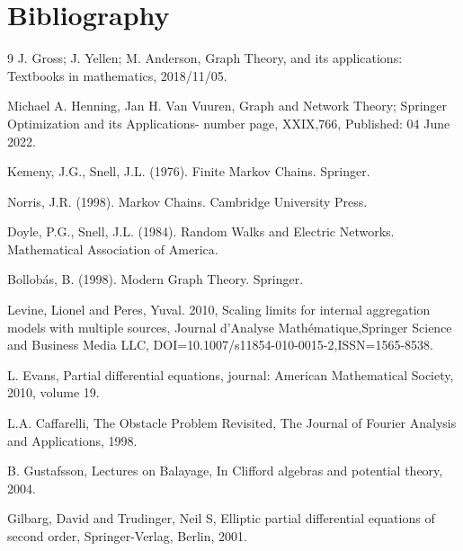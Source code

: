 \documentclass{article}
\begin{document}
\section{Bibliography}
\begin{thebibliography}{9}
    J. Gross; J. Yellen; M. Anderson, Graph Theory, and its applications: Textbooks in mathematics, 2018/11/05.
    
     Michael A. Henning, Jan H. Van Vuuren, Graph and Network Theory; Springer Optimization and its Applications- number page, XXIX,766, Published: 04 June 2022.

    Kemeny, J.G., Snell, J.L. (1976). Finite Markov Chains. Springer.

  Norris, J.R. (1998). Markov Chains. Cambridge University Press.

  Doyle, P.G., Snell, J.L. (1984). Random Walks and Electric Networks. Mathematical Association of America.

 Bollobás, B. (1998). Modern Graph Theory. Springer.

  Levine, Lionel and Peres, Yuval. 2010, Scaling limits for internal aggregation models with multiple sources, Journal d’Analyse Mathématique,Springer Science and Business Media LLC, DOI={10.1007/s11854-010-0015-2},ISSN={1565-8538}.

 L. Evans, Partial differential equations, journal: American Mathematical Society, 2010, volume 19.

 L.A. Caffarelli, The Obstacle Problem Revisited, The Journal of Fourier Analysis and Applications, 1998.

B. Gustafsson, Lectures on Balayage, In Clifford  algebras  and  potential  theory, 2004.

Gilbarg, David and Trudinger, Neil S, Elliptic partial differential equations of second order, Springer-Verlag, Berlin, 2001.




 
\end{thebibliography}
\end{document}
